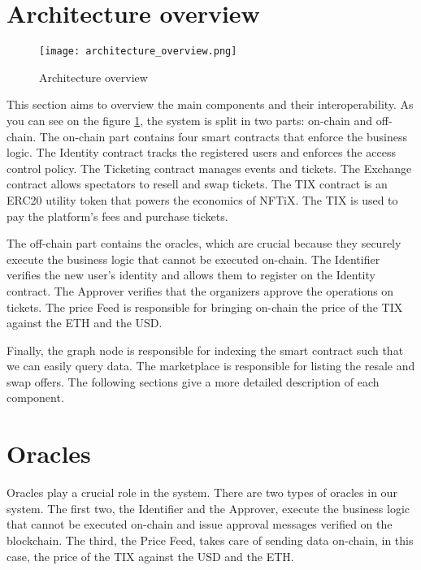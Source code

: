 \documentclass[a4paper,11pt,oneside]{report}
\begin{document}
\section{Architecture overview}

\begin{figure}[h!] 
  \centering
  \texttt{[image: architecture\_overview.png]}
  \caption{Architecture overview}
  \label{fig:architecture_overview}
\end{figure}

This section aims to overview the main components and their interoperability. As you can see on the figure \hyperref[fig:architecture_overview]{\ref{fig:architecture_overview}}, the system is split in two parts: on-chain and off-chain. The on-chain part contains four smart contracts that enforce the business logic. The Identity contract tracks the registered users and enforces the access control policy. The Ticketing contract manages events and tickets. The Exchange contract allows spectators to resell and swap tickets. The TIX contract is an ERC20 utility token that powers the economics of NFTiX. The TIX is used to pay the platform's fees and purchase tickets.

The off-chain part contains the oracles, which are crucial because they securely execute the business logic that cannot be executed on-chain. The Identifier verifies the new user's identity and allows them to register on the Identity contract. The Approver verifies that the organizers approve the operations on tickets. The price Feed is responsible for bringing on-chain the price of the TIX against the ETH and the USD.

Finally, the graph node is responsible for indexing the smart contract such that we can easily query data. The marketplace is responsible for listing the resale and swap offers. The following sections give a more detailed description of each component.

\section{Oracles}
Oracles play a crucial role in the system. There are two types of oracles in our system. The first two, the Identifier and the Approver, execute the business logic that cannot be executed on-chain and issue approval messages verified on the blockchain. The third, the Price Feed, takes care of sending data on-chain, in this case, the price of the TIX against the USD and the ETH.
\end{document}
